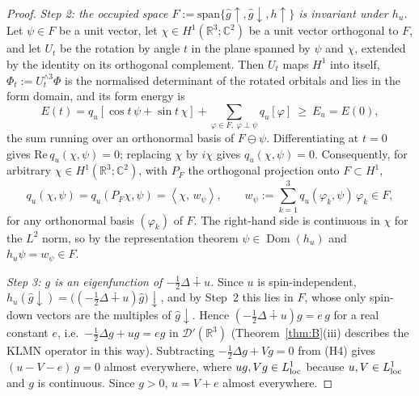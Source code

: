 \documentclass[11pt,a4paper]{article}
\theoremstyle{plain}
\theoremstyle{definition}
\theoremstyle{remark}
\newcommand{\R}{\mathbb{R}}
\newcommand{\C}{\mathbb{C}}
\newcommand{\ip}[2]{\left\langle #1,\,#2\right\rangle}
\DeclareMathOperator{\Dom}{Dom}
\newcommand{\hg}{\hat g}
\begin{document}
\begin{proof}
\emph{Step 2: the occupied space $F:=\mathrm{span}\{\hg\!\uparrow,\hg\!\downarrow,h\!\uparrow\}$ is invariant under $h_u$.} Let $\psi\in F$ be a unit vector, let $\chi\in H^1(\R^3;\C^2)$ be a unit vector orthogonal to $F$, and let $U_t$ be the rotation by angle $t$ in the plane spanned by $\psi$ and $\chi$, extended by the identity on its orthogonal complement. Then $U_t$ maps $H^1$ into itself, $\Phi_t:=U_t^{\wedge3}\Phi$ is the normalised determinant of the rotated orbitals and lies in the form domain, and its form energy is
\[
E(t)=q_u[\cos t\,\psi+\sin t\,\chi]+\sum_{\varphi\in F,\ \varphi\perp\psi}q_u[\varphi]\ \ge\ E_u=E(0),
\]
the sum running over an orthonormal basis of $F\ominus\psi$. Differentiating at $t=0$ gives $\mathrm{Re}\,q_u(\chi,\psi)=0$; replacing $\chi$ by $i\chi$ gives $q_u(\chi,\psi)=0$. Consequently, for arbitrary $\chi\in H^1(\R^3;\C^2)$, with $P_F$ the orthogonal projection onto $F\subset H^1$,
\[
q_u(\chi,\psi)=q_u(P_F\chi,\psi)=\ip{\chi}{w_\psi},\qquad w_\psi:=\sum_{k=1}^3 q_u(\varphi_k,\psi)\,\varphi_k\in F ,
\]
for any orthonormal basis $(\varphi_k)$ of $F$. The right-hand side is continuous in $\chi$ for the $L^2$ norm, so by the representation theorem \cite[VI, Thm.~2.1(iii)]{Kato} $\psi\in\Dom(h_u)$ and $h_u\psi=w_\psi\in F$.

\emph{Step 3: $g$ is an eigenfunction of $-\tfrac12\Delta\dotplus u$.} Since $u$ is spin-independent, $h_u(\hg\!\downarrow)=\big((-\tfrac12\Delta\dotplus u)\hg\big)\!\downarrow$, and by Step~2 this lies in $F$, whose only spin-down vectors are the multiples of $\hg\!\downarrow$. Hence $(-\tfrac12\Delta\dotplus u)g=e\,g$ for a real constant $e$, i.e.\ $-\tfrac12\Delta g+ug=eg$ in $\mathcal D'(\R^3)$ (Theorem~\ref{thm:B}(iii) describes the KLMN operator in this way). Subtracting $-\tfrac12\Delta g+Vg=0$ from (H4) gives $(u-V-e)\,g=0$ almost everywhere, where $ug,Vg\in L^1_{\rm loc}$ because $u,V\in L^1_{\rm loc}$ and $g$ is continuous. Since $g>0$, $u=V+e$ almost everywhere. \qedhere
\end{proof}
\end{document}
